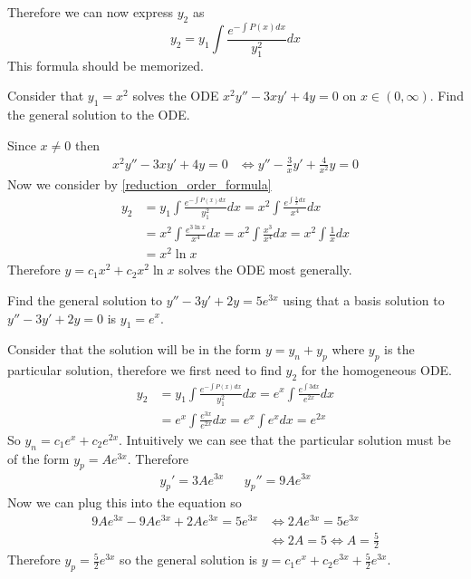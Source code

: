 \documentclass[notes]{subfiles}
\begin{document}
Therefore we can now express $y_2$ as
\begin{equation} \label{reduction_order_formula}
    y_2 = y_1\int \frac{e^{-\int P(x)dx}}{y_1^2} dx
\end{equation}
This formula should be memorized.

\begin{exercise}
    Consider that $y_1 = x^2$ solves the ODE $x^2y'' - 3xy' + 4y = 0$ on $x \in (0, \infty)$. Find the general solution to the ODE.
\end{exercise}
\begin{solution}
    Since $x \neq 0$ then
    \begin{align*}
        x^2y'' - 3xy' + 4y = 0
        &\iff y'' - \frac{3}{x}y' + \frac{4}{x^2}y = 0
    \end{align*}
    Now we consider by \cref{reduction_order_formula}
    \begin{align*}
        y_2
        &= y_1\int \frac{e^{-\int P(x)dx}}{y_1^2} dx
        = x^2\int \frac{e^{\int \frac{3}{x}dx}}{x^4} dx \\
        &= x^2\int \frac{e^{3\ln x}}{x^4} dx
        = x^2\int \frac{x^3}{x^4} dx
        = x^2\int \frac{1}{x} dx \\
        &= x^2\ln x
    \end{align*}
    Therefore $y = c_1x^2 + c_2x^2\ln x$ solves the ODE most generally.
\end{solution}

\begin{exercise} \label{constant_coeff_example}
    Find the general solution to $y'' - 3y' + 2y = 5e^{3x}$ using that a basis solution to $y'' - 3y' + 2y = 0$ is $y_1 = e^x$.
\end{exercise}
\begin{solution}
    Consider that the solution will be in the form $y = y_n + y_p$ where $y_p$ is the particular solution, therefore we first need to find $y_2$ for the homogeneous ODE.
    \begin{align*}
        y_2
        &= y_1\int \frac{e^{-\int P(x)dx}}{y_1^2} dx
        = e^x\int \frac{e^{\int 3dx}}{e^{2x}} dx \\
        &= e^x\int \frac{e^{3x}}{e^{2x}} dx
        = e^x\int e^x dx
        = e^{2x}
    \end{align*}
    So $y_n = c_1e^x + c_2e^{2x}$. Intuitively we can see that the particular solution must be of the form $y_p = Ae^{3x}$. Therefore
    \begin{align*}
        y_p' = 3Ae^{3x} && y_p'' = 9Ae^{3x}
    \end{align*}
    Now we can plug this into the equation so
    \begin{align*}
        9Ae^{3x} - 9Ae^{3x} + 2Ae^{3x} = 5e^{3x}
        &\iff 2Ae^{3x} = 5e^{3x} \\
        &\iff 2A = 5
        \iff A = \frac{5}{2}
    \end{align*}
    Therefore $y_p = \frac{5}{2}e^{3x}$ so the general solution is $y = c_1e^x + c_2e^{3x} + \frac{5}{2}e^{3x}$.
\end{solution}
\end{document}
